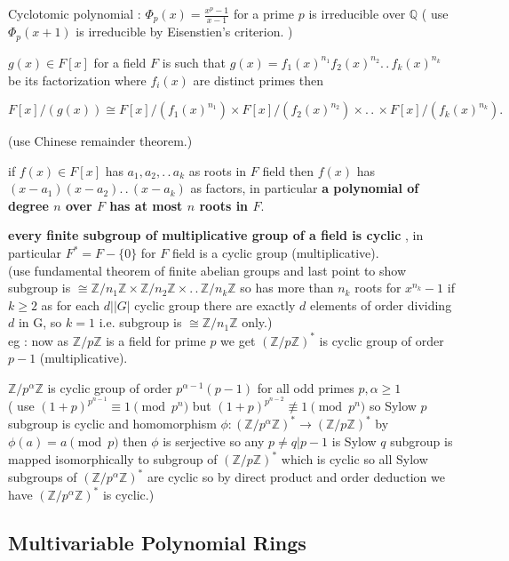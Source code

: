\documentclass[11pt]{extarticle}
\newcommand{\ra}{\rightarrow}
\newcommand{\Z}{\mathbb{Z}}
\newcommand{\Q}{\mathbb{Q}}
\newcommand{\ck}{.\,.\,}
\newcommand{\tm}{\times}
\newcommand{\snote}[1]{{\footnotesize(#1)}}
\newcommand{\tbx}[2][]{
	\begin{tcolorbox}[enhanced,breakable,size=small,colback=black!2!white,title={#1},arc is angular, arc=1.5mm,drop fuzzy shadow]
		#2
	\end{tcolorbox}
}
\begin{document}
\begin{multicols}{2}
\tbx{Cyclotomic polynomial : $\Phi_p(x)=  \frac{ x^p-1 }{x-1}  $ for a prime $ p $ is irreducible over $ \Q $ \snote{ use $ \Phi_p(x+1) $ is irreducible by Eisenstien's criterion. }
			 }
\tbx{  $ g(x) \in F[x] $ for a field $ F $ is such that $ g(x)=f_1(x)^{n_1} f_2(x)^{n_2}\ck f_k(x)^{n_k}$ be its factorization where $ f_i(x) $ are distinct primes then 
			\begin{center}
				$ F[x]/(g(x))\cong F[x]/(f_1(x)^{n_1})\tm F[x]/(f_2(x)^{n_2})\tm \ck \tm F[x]/(f_k(x)^{n_k}) .$
			\end{center}  \snote{use Chinese remainder theorem.}
			} 
\tbx{if $ f(x) \in F[x]$ has $ a_1,a_2,\ck a_k $ as roots in $ F $ field then $ f(x) $ has $ (x-a_1)(x-a_2)\ck (x-a_k) $ as factors, in particular \textbf{a polynomial of degree $ n $ over $ F $ has at most $ n $ roots in $ F .$}
			} 
\tbx{\textbf{every finite subgroup of multiplicative group of a field is cyclic} , in particular $ F^*=F-\{0\} $ for $ F $ field is a cyclic group (multiplicative). \\
			\snote{use fundamental theorem of finite abelian groups and last point to show subgroup is $ \cong \Z/n_1\Z\tm 
				\Z/n_2\Z\tm \ck \Z/n_k\Z$ so has more than $ n_k $ roots for $ x^{n_k}-1 $  if $ k\geq 2 $ as for each $ d||G| $ cyclic group there are exactly $ d $ elements of order dividing $ d $ in G, so $ k=1 $ i.e.  subgroup is $ \cong \Z/n_1\Z$ only.}\\
			eg : now as $ \Z/p\Z $ is a field for prime $ p $ we get $ (\Z/p\Z )^* $ is cyclic group of order $ p-1 $ (multiplicative).}
			 
\tbx{$ \Z/p^\alpha\Z $ is cyclic group of order $ p^{\alpha-1}(p-1) $ for all odd primes $ p, \alpha \geq 1$ \\
			\snote{ use $ (1+p)^{p^{n-1}}\equiv 1 \pmod p^n $ but $ (1+p)^{p^{n-2}}	\not\equiv 1 \pmod p^n $ so Sylow $ p $ subgroup is cyclic and homomorphism  $ \phi : (\Z/p^\alpha\Z )^*\ra (\Z/p\Z )^*$ by $ \phi(a) = a \pmod p $ then $ \phi $ is serjective so any $ p\neq q| p-1 $ is Sylow $q$ subgroup is mapped isomorphically to subgroup of $ (\Z/p\Z )^*$ which is cyclic so all Sylow subgroups of $(\Z/p^\alpha\Z )^*$ are cyclic so by direct product and order deduction we have $ (\Z/p^\alpha\Z )^* $ is cyclic.}}
			

		\subsection{ Multivariable Polynomial Rings }


\end{multicols}
\end{document}
